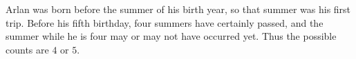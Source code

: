 Arlan was born before the summer of his birth year, so that summer was his first trip. Before his fifth birthday, four summers have certainly passed, and the summer while he is four may or may not have occurred yet. Thus the possible counts are $\boxed{4\text{ or }5}$.
